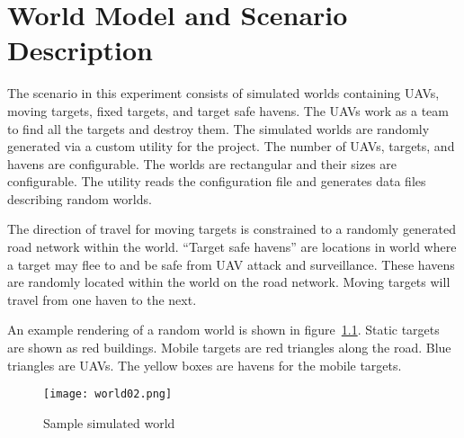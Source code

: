 \chapter{World Model and Scenario Description}
\label{chap:worldScenModel}
The scenario in this experiment consists of simulated worlds containing UAVs, moving targets, fixed targets, and target safe havens.  The UAVs work as a team to find all the targets and destroy them.  The simulated worlds are randomly generated via a custom utility for the project.  The number of UAVs, targets, and havens are configurable.  The worlds are rectangular and their sizes are configurable.  The utility reads the configuration file and generates data files describing random worlds.  


The direction of travel for moving targets is constrained to a randomly generated road network within the world.  ``Target safe havens'' are locations in world where a target may flee to and be safe from UAV attack and surveillance.  These havens are randomly located within the world on the road network.  Moving targets will travel from one haven to the next.

An example rendering of a random world is shown in figure~\ref{fig:sample_world}. Static targets are shown as red buildings.  Mobile targets are red triangles along the road.  Blue triangles are UAVs.  The yellow boxes are havens for the mobile targets.




\begin{figure}[H]
	\centering
	\texttt{[image: world02.png]}
	\caption{Sample simulated world}
	\label{fig:sample_world}
\end{figure}


